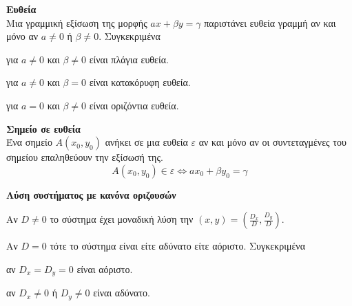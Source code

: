 \documentclass[twoside,nofonts,internet,math,spyros]{frontisthrio}
\begin{document}
\begin{arithmisi}
\item \textbf{Ευθεία}\\
Μια γραμμική εξίσωση της μορφής $ ax+\beta y=\gamma $ παριστάνει ευθεία γραμμή αν και μόνο αν $ a\neq 0 $ ή $ \beta\neq 0 $. Συγκεκριμένα
\begin{rlist}
\item για $ a\neq 0 $ και $ \beta\neq 0 $ είναι πλάγια ευθεία.
\item για $ a\neq 0 $ και $ \beta=0 $ είναι κατακόρυφη ευθεία.
\item για $ a=0 $ και $ \beta\neq 0 $ είναι οριζόντια ευθεία.
\end{rlist}
\item\textbf{Σημείο σε ευθεία}\\
Ένα σημείο $ A(x_0,y_0) $ ανήκει σε μια ευθεία $ \varepsilon $ αν και μόνο αν οι συντεταγμένες του σημείου επαληθεύουν την εξίσωσή της.
\[ A(x_0,y_0)\in\varepsilon\Leftrightarrow ax_0+\beta y_0=\gamma \]
\item\textbf{Λύση συστήματος με κανόνα οριζουσών}
\vspace{-2mm}
\begin{rlist}
\item Αν $ D\neq 0 $ το σύστημα έχει μοναδική λύση την $ (x,y)=\left(\frac{D_x}{D},\frac{D_y}{D}\right) $.
\item Αν $ D=0 $ τότε το σύστημα είναι είτε αδύνατο είτε αόριστο. Συγκεκριμένα
\begin{alist}
\item αν $ D_x=D_y=0 $ είναι αόριστο.
\item αν $ D_x\neq 0 $ ή $ D_y\neq 0 $ είναι αδύνατο.
\end{alist}
\end{rlist}
\end{arithmisi}
\methodologia
\end{document}
